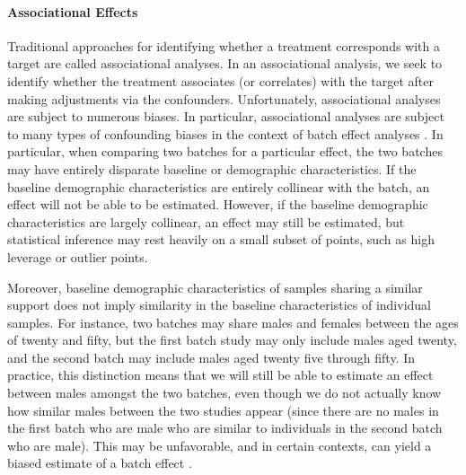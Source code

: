 \paragraph{Associational Effects} Traditional approaches for identifying whether a treatment corresponds with a target are called associational analyses. In an associational analysis, we seek to identify whether the treatment associates (or correlates) with the target after making adjustments via the confounders. Unfortunately, associational analyses are subject to numerous biases. In particular, associational analyses are subject to many types of confounding biases in the context of batch effect analyses \cite{Lee2011}. In particular, when comparing two batches for a particular effect, the two batches may have entirely disparate baseline or demographic characteristics. If the baseline demographic characteristics are entirely collinear with the batch, an effect will not be able to be estimated. However, if the baseline demographic characteristics are largely collinear, an effect may still be estimated, but statistical inference may rest heavily on a small subset of points, such as high leverage or outlier points. 

Moreover, baseline demographic characteristics of samples sharing a similar support does not imply similarity in the baseline characteristics of individual samples. For instance, two batches may share males and females between the ages of twenty and fifty, but the first batch study may only include males aged twenty, and the second batch may include males aged twenty five through fifty. In practice, this distinction means that we will still be able to estimate an effect between males amongst the two batches, even though we do not actually know how similar males between the two studies appear (since there are no males in the first batch who are male who are similar to individuals in the second batch who are male). This may be unfavorable, and in certain contexts, can yield a biased estimate of a batch effect \cite{Rosenbaum1983Apr}.

